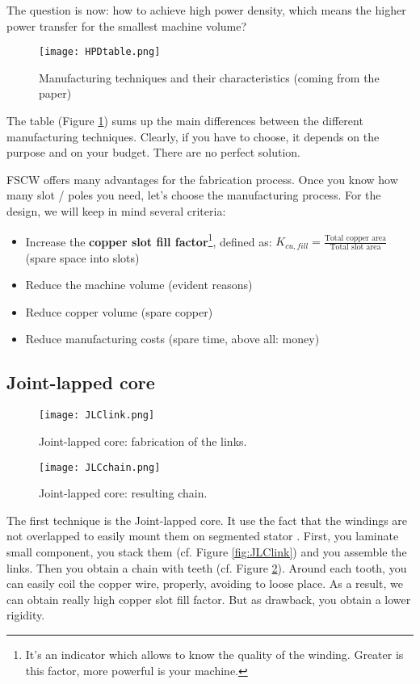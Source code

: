 The question is now: how to achieve high power density, which means the higher power transfer for the smallest machine volume?


\begin{figure}[H]
    \centering
    \texttt{[image: HPDtable.png]}
    \caption{Manufacturing techniques and their characteristics (coming from the paper)}
    \label{fig:HPD}
\end{figure}

The table (Figure \ref{fig:HPD}) sums up the main differences between the different manufacturing techniques. Clearly, if you have to choose, it depends on the purpose and on your budget. There are no perfect solution.

FSCW offers many advantages for the fabrication process. Once you know how many slot / poles you need, let's choose the manufacturing process.
For the design, we will keep in mind several criteria: 
\begin{itemize}
    \item Increase the \textbf{copper slot fill factor}\footnote{It’s an indicator which allows to know the quality of the winding. Greater is this factor, more powerful is your machine.}, defined as: $K_{cu,fill} = \frac{\text{Total copper area}}{\text{Total slot area}}$ (spare space into slots)
    \item Reduce the machine volume (evident reasons)
    \item Reduce copper volume (spare copper)
    \item Reduce manufacturing costs (spare time, above all: money)
\end{itemize}

\subsection{Joint-lapped core}
\begin{figure}[H]
    \begin{minipage}{0.49 \textwidth}
    \centering
        \texttt{[image: JLClink.png]}
        \caption{Joint-lapped core: fabrication of the links.}
        \label{fig:JLClink}
    \end{minipage}
    \begin{minipage}{0.49 \textwidth}
        \centering
        \texttt{[image: JLCchain.png]}
        \caption{Joint-lapped core: resulting chain.}
        \label{fig:JLCchain}
    \end{minipage}
\end{figure}
The first technique is the Joint-lapped core. It use the fact that the windings are not overlapped to easily mount them on segmented stator .
First, you laminate small component, you stack them (cf. Figure \ref{fig:JLClink}) and you assemble the links. Then you obtain a chain with teeth (cf. Figure \ref{fig:JLCchain}). Around each tooth, you can easily coil the copper wire, properly, avoiding to loose place. As a result, we can obtain really high copper slot fill factor. But as drawback, you obtain a lower rigidity.

